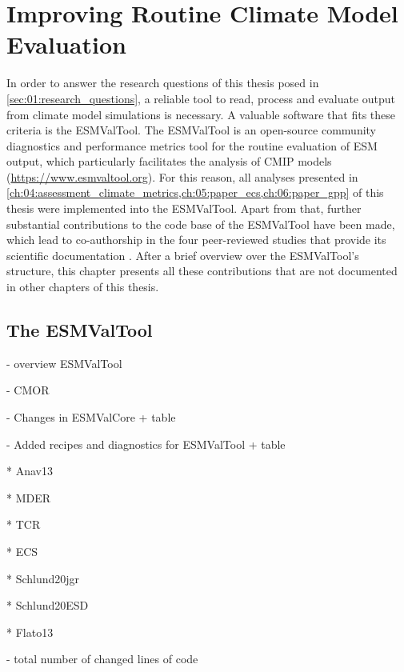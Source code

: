 


\chapter{Improving Routine Climate Model Evaluation}
\label{ch:03:esmvaltool}

In order to answer the research questions of this thesis posed in
\cref{sec:01:research_questions}, a reliable tool to read, process and evaluate
output from climate model simulations is necessary. A valuable software that
fits these criteria is the \ac{ESMValTool}. The \ac{ESMValTool} is an
open-source community diagnostics and performance metrics tool for the routine
evaluation of \ac{ESM} output, which particularly facilitates the analysis of
\ac{CMIP} models (\url{https://www.esmvaltool.org}). For this reason, all
analyses presented in
\cref{ch:04:assessment_climate_metrics,ch:05:paper_ecs,ch:06:paper_gpp} of this
thesis were implemented into the \ac{ESMValTool}. Apart from that, further
substantial contributions to the code base of the \ac{ESMValTool} have been
made, which lead to co-authorship in the four peer-reviewed studies that
provide its scientific documentation \autocite{Eyring2020, Lauer2020,
  Righi2020, Weigel2020}. After a brief overview over the \ac{ESMValTool}'s
structure, this chapter presents all these contributions that are not
documented in other chapters of this thesis.


\section{The \acf{ESMValTool}}
\label{sec:03:esmvaltool}

- overview ESMValTool

- CMOR

- Changes in ESMValCore + table

- Added recipes and diagnostics for ESMValTool + table

* Anav13

* MDER

* TCR

* ECS

* Schlund20jgr

* Schlund20ESD

* Flato13

- total number of changed lines of code